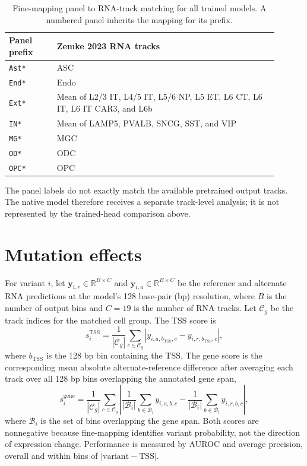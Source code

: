 \documentclass[11pt]{article}
\begin{document}
\begin{table}[ht]
\centering
\scriptsize
\caption{Fine-mapping panel to RNA-track matching for all trained models. A
numbered panel inherits the mapping for its prefix.}
\label{tab:cell_matching}
\begin{tabular}{@{}p{0.16\linewidth}p{0.74\linewidth}@{}}
\toprule
Panel prefix & Zemke 2023 RNA tracks \\
\midrule
\texttt{Ast*} & ASC \\
\texttt{End*} & Endo \\
\texttt{Ext*} & Mean of L2/3 IT, L4/5 IT, L5/6 NP, L5 ET, L6 CT, L6 IT, L6 IT CAR3, and L6b \\
\texttt{IN*} & Mean of LAMP5, PVALB, SNCG, SST, and VIP \\
\texttt{MG*} & MGC \\
\texttt{OD*} & ODC \\
\texttt{OPC*} & OPC \\
\bottomrule
\end{tabular}
\end{table}

The panel labels do not exactly match the available pretrained output tracks.
The native model therefore receives a separate track-level analysis; it is not
represented by the trained-head comparison above.

\section{Mutation effects}
For variant $i$, let $\mathbf{y}_{i,r}\in\mathbb{R}^{B\times C}$ and
$\mathbf{y}_{i,a}\in\mathbb{R}^{B\times C}$ be the reference and alternate
RNA predictions at the model's 128 base-pair (bp) resolution, where $B$ is the number of
output bins and $C=19$ is the number of RNA tracks. Let $\mathcal{C}_g$ be the
track indices for the matched cell group. The TSS score is \begin{equation}
s_i^{\mathrm{TSS}}=\frac{1}{|\mathcal{C}_g|}\sum_{c\in\mathcal{C}_g}\left|y_{i,a,b_{\mathrm{TSS}},c}-y_{i,r,b_{\mathrm{TSS}},c}\right|,
\end{equation}
where $b_{\mathrm{TSS}}$ is the 128 bp bin containing the TSS. The gene score
is the corresponding mean absolute alternate-reference difference after
averaging each track over all 128 bp bins overlapping the annotated gene
span, \begin{equation}
s_i^{\mathrm{gene}}=\frac{1}{|\mathcal{C}_g|}\sum_{c\in\mathcal{C}_g}\left|\frac{1}{|\mathcal{B}_i|}\sum_{b\in\mathcal{B}_i}y_{i,a,b,c}-\frac{1}{|\mathcal{B}_i|}\sum_{b\in\mathcal{B}_i}y_{i,r,b,c}\right|,
\end{equation}
where $\mathcal{B}_i$ is the set of bins overlapping the gene span. Both
scores are nonnegative because fine-mapping identifies variant probability,
not the direction of expression change. Performance is measured by AUROC
and average precision, overall and within bins of $|\mathrm{variant}-\mathrm{TSS}|$.
\end{document}

